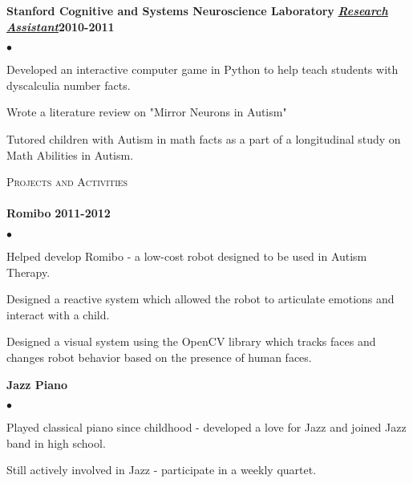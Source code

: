 \documentclass{article}
\newcommand{\lineunder}{\vspace*{-8pt} \\ \hspace*{-18pt} \hrulefill \\}
\newcommand{\header}[1]{{\hspace*{-15pt}\vspace*{6pt} \textsc{\large #1}} \vspace*{-6pt} \lineunder}
\newcommand{\employer}[3]{{ \textbf{#1} \underline{\textbf{\emph{#3}}}\hfill\textbf{#2}\\  }}
\newenvironment{achievements}{\begin{list}{$\bullet$}{\topsep 0pt \itemsep -2pt}}{\vspace*{4pt}\end{list}}
\newenvironment{summary}[2]{
\textbf{#1\hfill#2}
    \vspace*{-7pt}
    \begin{itemize}
            \setlength{\itemsep}{0.5pt}
            \setlength{\parskip}{0.5pt}
            \renewcommand{\labelitemi}{$\cdot$}}
            {\end{itemize} \vspace*{-2pt}}
\begin{document}
\employer{Stanford Cognitive and Systems Neuroscience Laboratory}{2010-2011}{Research Assistant}
    \begin{achievements}
    \item Developed an interactive computer game in Python to help teach students with dyscalculia number facts.
    \item Wrote a literature review on "Mirror Neurons in Autism"
    \item Tutored children with Autism in math facts as a part of a longitudinal study on Math Abilities in Autism.
    \end{achievements}
\medskip

\header{Projects and Activities}
\employer{Romibo}{2011-2012}{}
	\begin{achievements}
	    \item Helped develop Romibo - a low-cost robot designed to be used in Autism Therapy.
        \item Designed a reactive system which allowed the robot to articulate emotions and interact with a child. 
        \item Designed a visual system using the OpenCV library which tracks faces and changes robot behavior based on the presence of human faces. 
	\end{achievements}


\employer{Jazz Piano}{}{}
	\begin{achievements}
        \item Played classical piano since childhood - developed a love for Jazz and joined Jazz band in high school.
        \item Still actively involved in Jazz - participate in a weekly quartet.
	\end{achievements}


\end{document}
